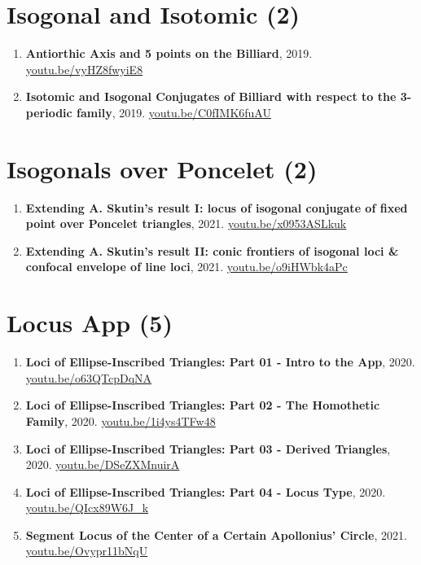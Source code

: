\documentclass[12pt]{article}
\begin{document}
\section{Isogonal and Isotomic (2)}

\begin{enumerate}[resume]
\item \textbf{Antiorthic Axis and 5 points on the Billiard}, 2019. \href{https://youtu.be/vyHZ8fwyiE8}{\url{youtu.be/vyHZ8fwyiE8}}
\item \textbf{Isotomic and Isogonal Conjugates of Billiard with respect to the 3-periodic family}, 2019. \href{https://youtu.be/C0fIMK6fuAU}{\url{youtu.be/C0fIMK6fuAU}}
\end{enumerate}

\section{Isogonals over Poncelet (2)}

\begin{enumerate}[resume]
\item \textbf{Extending A. Skutin's result I: locus of isogonal conjugate of fixed point over Poncelet triangles}, 2021. \href{https://youtu.be/x0953ASLkuk}{\url{youtu.be/x0953ASLkuk}}
\item \textbf{Extending A. Skutin's result II: conic frontiers of isogonal loci \& confocal envelope of line loci}, 2021. \href{https://youtu.be/o9iHWbk4aPc}{\url{youtu.be/o9iHWbk4aPc}}
\end{enumerate}

\section{Locus App (5)}

\begin{enumerate}[resume]
\item \textbf{Loci of Ellipse-Inscribed Triangles: Part 01 - Intro to the App}, 2020. \href{https://youtu.be/o63QTcpDqNA}{\url{youtu.be/o63QTcpDqNA}}
\item \textbf{Loci of Ellipse-Inscribed Triangles: Part 02 - The Homothetic Family}, 2020. \href{https://youtu.be/1i4ys4TFw48}{\url{youtu.be/1i4ys4TFw48}}
\item \textbf{Loci of Ellipse-Inscribed Triangles: Part 03 - Derived Triangles}, 2020. \href{https://youtu.be/DSeZXMnuirA}{\url{youtu.be/DSeZXMnuirA}}
\item \textbf{Loci of Ellipse-Inscribed Triangles: Part 04 - Locus Type}, 2020. \href{https://youtu.be/QIcx89W6J_k}{\url{youtu.be/QIcx89W6J\_k}}
\item \textbf{Segment Locus of the Center of a Certain Apollonius' Circle}, 2021. \href{https://youtu.be/Ovypr11bNqU}{\url{youtu.be/Ovypr11bNqU}}
\end{enumerate}
\end{document}
